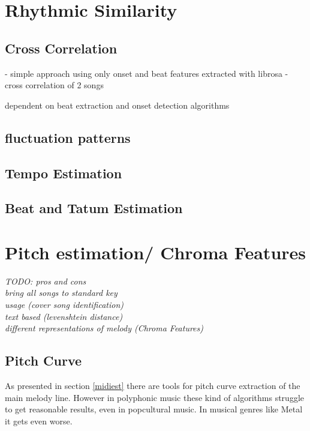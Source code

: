 \chapter{Rhythmic Similarity}

\section{Cross Correlation}

- simple approach using only onset and beat features extracted with librosa
- cross correlation of 2 songs

dependent on beat extraction and onset detection algorithms



\section{fluctuation patterns}

\section{Tempo Estimation}
\section{Beat and Tatum Estimation}


\chapter{Pitch estimation/ Chroma Features}

\textit{TODO: 
pros and cons\\
bring all songs to standard key \\
usage (cover song identification)\\
text based (levenshtein distance)\\
different representations of melody (Chroma Features)\\}

\section{Pitch Curve}

As presented in section \ref{midiest} there are tools for pitch curve extraction of the main melody line. However in polyphonic music these kind of algorithms struggle to get reasonable results, even in popcultural music. In musical genres like Metal it gets even worse. 


